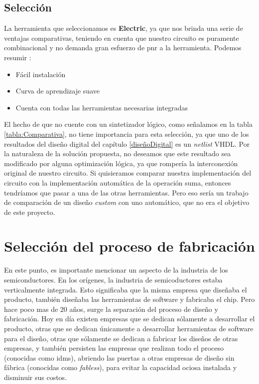 \subsection{Selección}
La herramienta que seleccionamos es \textbf{Electric}, ya que nos brinda una serie de ventajas comparativas, teniendo en cuenta que nuestro circuito es puramente combinacional y no demanda gran esfuerzo de \gls{pnr} a la herramienta. Podemos resumir :
\begin{itemize}
\item Fácil instalación
\item Curva de aprendizaje suave
\item Cuenta con todas las herramientas necesarias integradas
\end{itemize}
El hecho de que no cuente con un sintetizador lógico, como señalamos en la tabla \ref{tabla:Comparativa}, no tiene importancia para esta selección, ya que uno de los resultados del diseño digital del capítulo \ref{diseñoDigital} es un \emph{netlist} VHDL. Por la naturaleza de la solución propuesta, no deseamos que este resultado sea modificado por alguna optimización lógica, ya que rompería la interconexión original de nuestro circuito. Si quisieramos comparar nuestra implementación del circuito con la implementación automática de la operación suma, entonces tendríamos que pasar a una de las otras herramientas. Pero eso sería un trabajo de comparación de un diseño \emph{custom} con uno automático, que no era el objetivo de este proyecto. 

\section{Selección del proceso de fabricación}\label{procesoFabricación}

En este punto, es importante mencionar un aspecto de la industria de los semiconductores. En los orígenes, la industria de semicoductores estaba verticalmente integrada. Esto significaba que la misma empresa que diseñaba el producto, también diseñaba las herramientas de software y fabricaba el chip. Pero hace poco mas de 20 años, surge la separación del proceso de diseño y fabricación. Hoy en día existen empresas que se dedican sólamente a desarrollar el producto, otras que se dedican únicamente a desarrollar herramientas de software para el diseño, otras que sólamente se dedican a fabricar los diseños de otras empresas, y también persisten las empresas que realizan todo el proceso (conocidas como \gls{idms}), abriendo las puertas a otras empresas de diseño sin fábrica (conocidas como \emph{fabless}), para evitar la capacidad ociosa instalada y disminuir sus costos.
